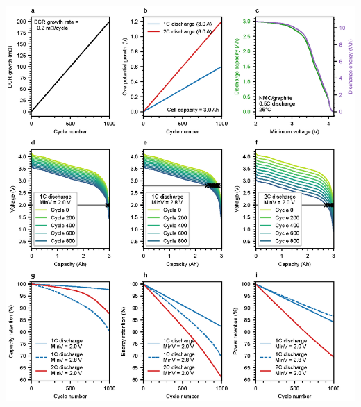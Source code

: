 \documentclass{article}
\begin{document}
{
\centering
\includegraphics[scale=0.9]{figures/dcr_growth_knee.eps}
}
\end{document}
